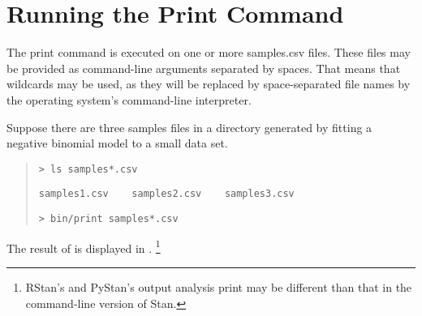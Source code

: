 \section{Running the Print Command}

The print command is executed on one or more samples.csv files.  These
files may be provided as command-line arguments separated by spaces.
That means that wildcards may be used, as they will be replaced by
space-separated file names by the operating system's command-line
interpreter. 

Suppose there are three samples files in a directory generated by
fitting a negative binomial model to a small data set.
%
\begin{quote}
\begin{Verbatim}[fontshape=sl]
> ls samples*.csv
\end{Verbatim}
%
\begin{Verbatim}
samples1.csv	samples2.csv	samples3.csv
\end{Verbatim}
%
\begin{Verbatim}[fontshape=sl]
> bin/print samples*.csv
\end{Verbatim}
\end{quote}
%
The result of  is displayed in
.%
%
\footnote{RStan's and PyStan's output analysis print may be different
  than that in the command-line version of Stan.}
%
